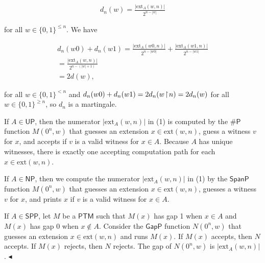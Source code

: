 \documentclass[10pt,a4paper]{article}
\begin{document}
\[\begin{gathered}
d_{n}(w)=\frac{|\mathrm{ext}_{A}(w,n)|}{2^{n-|w|}}
\end{gathered}\]


for all
$w\in\{0,1\}^{\leq n}.$
We have\par


\[\begin{gathered}
\displaystyle d_{n}(w0)+d_{n}(w1) \displaystyle= \displaystyle\frac{|\mathrm{ext}_{A}(w0,n)|}{2^{n-|w0|}}+\frac{|\mathrm{ext}_{A}(w1,n)|}{2^{n-|w1|}} \\
\displaystyle= \displaystyle\frac{|\mathrm{ext}_{A}(w,n)|}{2^{n-(|w|+1)}} \\
\displaystyle= \displaystyle 2d(w),
\end{gathered}\]


for all $w\in\{0,1\}^{<n}$ and $d_{n}(w0)+d_{n}(w1)=2d_{n}(w\negthinspace\upharpoonright\negthinspace n)=2d_{n}(w)$ for all $w\in\{0,1\}^{\geq n}$, so $d_{n}$ is a martingale.\par




If $A\in\mathsf{UP}$, then the numerator $|\mathrm{ext}_{A}(w,n)|$ in (1) is computed by the ${\mathsf{\#}\mathsf{P}}$ function $M(0^{n},w)$ that guesses an extension $x\in\mathrm{ext}(w,n)$, guess a witness $v$ for $x$, and accepts if $v$ is a valid witness for $x\in A$. Because $A$ has unique witnesses, there is exactly one accepting computation path for each $x\in\mathrm{ext}(w,n)$.\par




If $A\in\mathsf{NP}$, then we compute the numerator $|\mathrm{ext}_{A}(w,n)|$ in (1) by the $\mathsf{SpanP}$ function $M(0^{n},w)$ that guesses an extension $x\in\mathrm{ext}(w,n)$, guesses a witness $v$ for $x$, and prints $x$ if $v$ is a valid witness for $x\in A$.\par




If $A\in\mathsf{SPP}$, let $M$ be a $\mathsf{PTM}$ such that $M(x)$ has gap 1 when $x\in A$ and $M(x)$ has gap 0 when $x\not\in A$.
Consider the $\mathsf{GapP}$ function $N(0^{n},w)$ that guesses an extension $x\in\mathrm{ext}(w,n)$ and runs $M(x)$. If $M(x)$ accepts, then $N$ accepts. If $M(x)$ rejects, then $N$ rejects. The gap of $N(0^{n},w)$ is $|\mathrm{ext}_{A}(w,n)|$.
$\blacktriangleleft$\par
\end{document}
